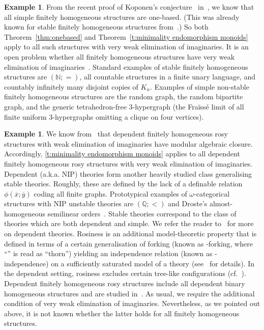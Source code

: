 \documentclass{article}
\theoremstyle{remark}
\theoremstyle{definition}
\newtheorem{example}[theorem]{Example}
\begin{document}
{{{{{\begin{example} %
From the recent proof of Koponen's conjecture~\cite{koponen2016binary} in~\cite{baldwin2024simplehomogeneousstructuresindiscernible}, we know that all simple finitely homogeneous structures are one-based. (This was already known for stable finitely homogeneous structures from~\cite{cherlin1985}.) So both Theorem~\ref{thm:onebased} and Theorem~\ref{t:minimality endomorphism monoids} apply to all such structures with   very weak elimination of imaginaries. It is an open problem whether all finitely homogeneous structures have very weak elimination of imaginaries~\cite[Problem 18]{cherlin2022homogeneous}. Standard examples of stable finitely homogeneous structures are $(\mathbb{N}; =)$, all countable structures in a finite unary language, and countably infinitely many disjoint copies of $K_n$. 
Examples of simple non-stable finitely homogeneous structures are the random graph, the random bipartite graph, and the generic tetrahedron-free $3$-hypergraph (the Fra\"{i}ss\'{e} limit of all finite uniform $3$-hypergraphs omitting a clique on four vertices). %
\end{example}

\begin{example} We know from~\cite[Theorem 4.1.1]{onshuus2021dependent} that dependent finitely homogeneous rosy structures with weak elimination of imaginaries have modular algebraic closure. Accordingly, \cref{t:minimality endomorphism monoids} applies to all dependent finitely homogeneous rosy structures with very weak elimination of imaginaries. Dependent (a.k.a. $\mathrm{NIP}$) theories form another heavily studied class generalising stable theories. Roughly, these are defined by the lack of a definable relation $\phi(\overline{x}; \overline{y})$ coding all finite graphs. Prototypical examples of $\omega$-categorical structures with $\mathrm{NIP}$ unstable theories are $(\mathbb{Q}; <)$ and Droste’s almost-homogeneous semilinear orders~\cite{droste1985structure}. Stable theories correspond to the class of theories which are both dependent and simple. We refer the reader to~\cite{simon2015guide} for more on dependent theories. Rosiness is an additional model-theoretic property that is defined in terms of a certain generalisation of forking (known as \th-forking, where ``\th'' is read as ``thorn'') yielding an independence relation (known as \th-independence) on a sufficiently saturated model of a theory (see~\cite{adler2009geometric} for details). In the dependent setting, rosiness excludes certain tree-like configurations (cf.~\cite{SimonPierre2022N}). Dependent finitely homogeneous rosy structures include all dependent binary homogeneous structures and are studied in~\cite{onshuus2021dependent, SimonPierre2022N}. As usual, we require the additional condition of very weak elimination of imaginaries. Nevertheless, as we pointed out above, it is not known whether the latter holds for all finitely homogeneous structures.
\end{example}

}}}}}
\end{document}
